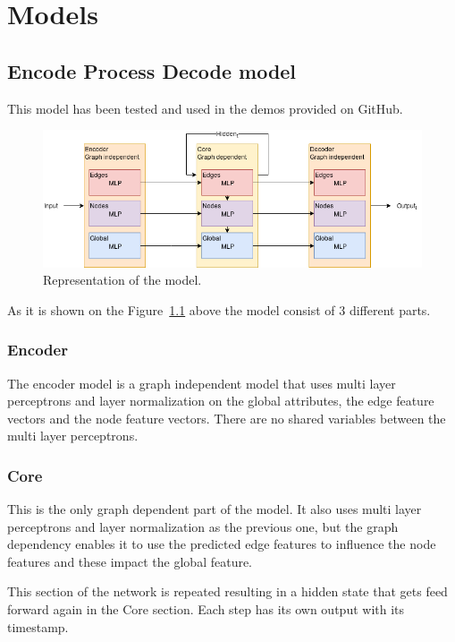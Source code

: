 \chapter{Models}\label{sect:Models}
\section{Encode Process Decode model}
This model has been tested and used in the demos provided on GitHub.
\begin{figure}[!ht]
	\centering
	\includegraphics[width=150mm, keepaspectratio]{figures/EPD.png}
	\caption{Representation of the model.}
	\label{fig:encode-process-decode}
\end{figure}

As it is shown on the Figure~\ref{fig:encode-process-decode} above the model consist of 3 different parts.

\subsection{Encoder}
The encoder model is a graph independent model that uses multi layer perceptrons and layer normalization on the global attributes, the edge feature vectors and the node feature vectors. There are no shared variables between the multi layer perceptrons.

\subsection{Core}
This is the only graph dependent part of the model. It also uses multi layer perceptrons and layer normalization as the previous one, but the graph dependency enables it to use the predicted edge features to influence the node features and these impact the global feature.

This section of the network is repeated resulting in a hidden state that gets feed forward again in the Core section. Each step has its own output with its timestamp.

